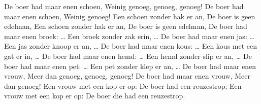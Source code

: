 \beginverse
De boer had maar enen schoen,
Weinig genoeg, genoeg, genoeg!
De boer had maar enen schoen,
Weinig genoeg! 
Een schoen zonder hak er an,
De boer is geen edelman,
Een schoen zonder hak er an,
De boer is geen edelman,
\endverse
\beginverse
De boer had maar enen broek: …
Een broek zonder zak erin, …
\endverse
\beginverse
De boer had maar enen jas: …
Een jas zonder knoop er an, …
\endverse
\beginverse
De boer had maar enen kous: …
Een kous met een gat er in, …
\endverse
\beginverse
De boer had maar enen hemd: …
Een hemd zonder slip er an, …
\endverse
\beginverse
De boer had maar enen pet: …
Een pet zonder klep er an, …
\endverse
\beginverse
De boer had maar enen vrouw,
Meer dan genoeg, genoeg, genoeg! 
De boer had maar enen vrouw,
Meer dan genoeg!
Een vrouw met een kop er op: 
De boer had een reuzestrop;
Een vrouw met een kop er op:
De boer die had een reuzestrop. 
\endverse
\endsong
